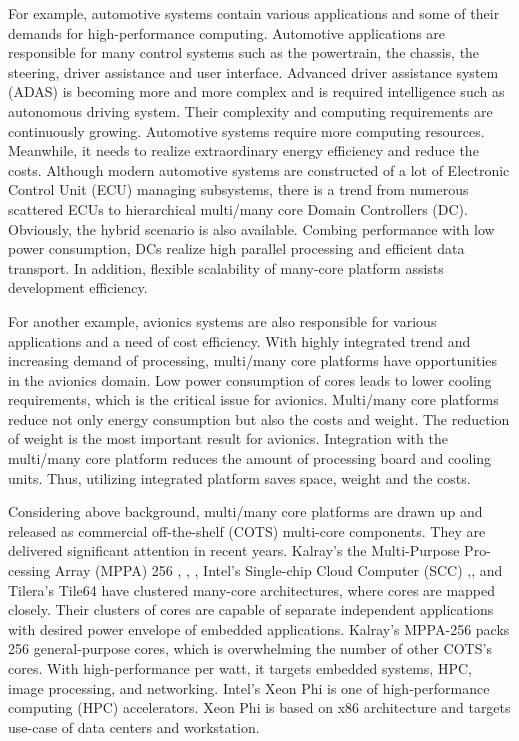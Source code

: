 \documentclass{sig-alternate-05-2015}
\begin{document}
For example, automotive systems contain various applications and some of their demands for high-performance computing.
Automotive applications are responsible for many control systems such as the powertrain, the chassis, the steering, driver assistance and user interface.
Advanced driver assistance system (ADAS) is becoming more and more complex and is required intelligence such as autonomous driving system.
Their complexity and computing requirements are continuously growing.
Automotive systems require more computing resources.
Meanwhile, it needs to realize extraordinary energy efficiency and reduce the costs.
Although modern automotive systems are constructed of a lot of Electronic Control Unit (ECU) managing subsystems,
there is a trend from numerous scattered ECUs to hierarchical multi/many core Domain Controllers (DC).
Obviously, the hybrid scenario is also available.
Combing performance with low power consumption, DCs realize high parallel processing and efficient data transport.
In addition, flexible scalability of many-core platform assists development efficiency.

For another example, avionics systems are also responsible for various applications and a need of cost efficiency.
With highly integrated trend and increasing demand of processing, multi/many core platforms have opportunities in the avionics domain.
Low power consumption of cores leads to lower cooling requirements, which is the critical issue for avionics.
Multi/many core platforms reduce not only energy consumption but also the costs and weight.
The reduction of weight is the most important result for avionics.
Integration with the multi/many core platform reduces the amount of processing board and cooling units.
Thus, utilizing integrated platform saves space, weight and the costs.

Considering above background, multi/many core platforms are drawn up and released as commercial off-the-shelf (COTS) multi-core components.
They are delivered significant attention in recent years.
Kalray's the Multi-Purpose Pro-cessing Array (MPPA) 256 \cite{de2013distributed}, \cite{de2013clustered}, \cite{de2014time},
Intel's Single-chip Cloud Computer (SCC) \cite{intel2015scc},\cite{baron2010single}, and
Tilera's Tile64 \cite{tilera2015tile64} have clustered many-core architectures,
where cores are mapped closely.
Their clusters of cores are capable of separate independent applications with desired power envelope of embedded applications.
Kalray's MPPA-256 packs 256 general-purpose cores, which is overwhelming the number of other COTS's cores.
With high-performance per watt, it targets embedded systems, HPC, image processing, and networking.
Intel's Xeon Phi \cite{chrysos2014intel} \cite{chrysos2012intel} is one of high-performance computing (HPC) accelerators.
Xeon Phi is based on x86 architecture and targets use-case of data centers and workstation.
\end{document}
